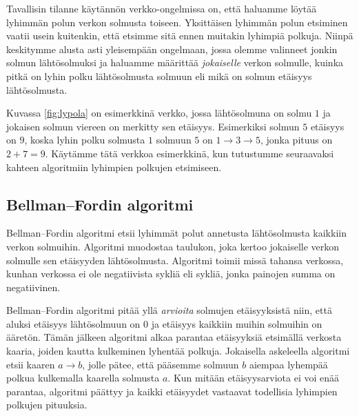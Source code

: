 Tavallisin tilanne käytännön verkko-ongelmissa on,
että haluamme löytää lyhimmän polun verkon solmusta toiseen.
Yksittäisen lyhimmän polun etsiminen vaatii usein kuitenkin,
että etsimme sitä ennen muitakin lyhimpiä polkuja.
Niinpä keskitymme alusta asti yleisempään ongelmaan,
jossa olemme valinneet jonkin solmun lähtösolmuksi
ja haluamme määrittää \emph{jokaiselle} verkon solmulle,
kuinka pitkä on lyhin polku lähtösol\-musta solmuun
eli mikä on solmun etäisyys lähtösolmusta.

Kuvassa \ref{fig:lypola} on esimerkkinä verkko,
jossa lähtösolmuna on solmu $1$ ja jokaisen solmun
viereen on merkitty sen etäisyys.
Esimerkiksi solmun $5$ etäisyys on $9$,
koska lyhin polku solmusta $1$ solmuun $5$ on
$1 \rightarrow 3 \rightarrow 5$, jonka pituus on $2+7=9$.
Käytämme tätä verkkoa esimerkkinä, kun tutustumme
seuraavaksi kahteen algoritmiin lyhimpien polkujen etsimiseen.

\subsection{Bellman–Fordin algoritmi}

Bellman–Fordin algoritmi etsii lyhimmät polut
annetusta lähtösolmusta kaikkiin verkon solmuihin.
Algoritmi muodostaa taulukon, joka kertoo jokaiselle
verkon solmulle sen etäisyyden lähtösolmusta.
Algoritmi toimii missä tahansa verkossa,
kunhan verkossa ei ole negatiivista sykliä eli sykliä,
jonka painojen summa on negatiivinen.

Bellman–Fordin algoritmi pitää yllä \emph{arvioita}
solmujen etäisyyksistä niin,
että aluksi etäisyys lähtösolmuun on 0 ja etäisyys
kaikkiin muihin solmuihin on ääretön.
Tämän jälkeen algoritmi alkaa parantaa etäisyyksiä
etsimällä verkosta kaaria, joiden kautta kulkeminen
lyhentää polkuja.
Jokaisella askeleella algoritmi etsii kaaren $a \rightarrow b$,
jolle pätee, että pääsemme solmuun $b$ aiempaa lyhempää polkua
kulkemalla kaarella solmusta $a$.
Kun mitään etäisyysarviota ei voi enää parantaa,
algoritmi päättyy ja kaikki etäisyydet vastaavat
todellisia lyhimpien polkujen pituuksia.

